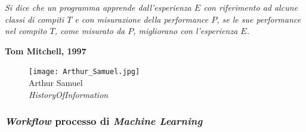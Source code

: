 \begin{frame}[t]
{\begin{minipage}[t]{\textwidth}
\begin{minipage}[t]{0.6\textwidth}
\begin{minipage}[t]{\textwidth}
                \renewcommand{\epigraphsize}{\scriptsize}
                \setlength{\afterepigraphskip}{0pt}
                \setlength{\beforeepigraphskip}{0pt}
                \setlength{\epigraphwidth}{0.9\textwidth}
                \epigraph{\textit{Si dice che un programma \alert{apprende} dall'esperienza $E$ con riferimento ad alcune classi di compiti $T$ e con misurazione della performance $P$, se le sue \emph{performance} nel compito $T$, come misurato da $P$, migliorano con l'esperienza $E$.}}{\textbf{Tom Mitchell, 1997}}
            \end{minipage}
        \end{minipage}
        \begin{minipage}[t]{0.4\textwidth}
            \centering
            \begin{figure}[ht]
                \texttt{[image: Arthur\_Samuel.jpg]}
                {\tiny\\Arthur Samuel\\\vspace*{-1pt}\textit{\textcopyright HistoryOfInformation}}
            \end{figure}
        \end{minipage}
    \end{minipage}
}
\end{frame}
%
\begin{frame}[t] \frametitle{\emph{Workflow} processo di \emph{Machine Learning}}
\end{frame}
